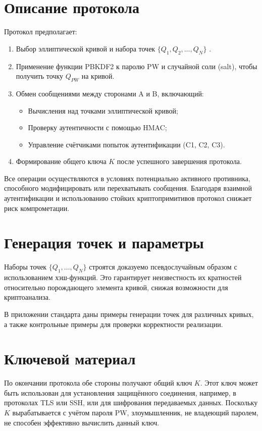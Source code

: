 \section*{Описание протокола}
\label{sec:prot_desc}
Протокол предполагает:
\begin{enumerate}
    \item Выбор эллиптической кривой и набора точек $\{Q_1, Q_2, \ldots, Q_N\}$ .
    \item Применение функции PBKDF2 к паролю PW и случайной соли (salt), чтобы получить точку $Q_{PW}$ на кривой.
    \item Обмен сообщениями между сторонами A и B, включающий:
    \begin{itemize}
        \item Вычисления над точками эллиптической кривой;
        \item Проверку аутентичности с помощью HMAC;
        \item Управление счётчиками попыток аутентификации (C1, C2, C3).
    \end{itemize}
    \item Формирование общего ключа $K$ после успешного завершения протокола.
\end{enumerate}

Все операции осуществляются в условиях потенциально активного противника, способного модифицировать или перехватывать
сообщения.
Благодаря взаимной аутентификации и использованию стойких криптопримитивов протокол снижает риск компрометации.

\section*{Генерация точек и параметры}
\label{sec:points}
Наборы точек $\{Q_1, \ldots, Q_N\}$ строятся доказуемо псевдослучайным образом с использованием хэш-функций.
Это гарантирует неизвестность их кратностей относительно порождающего элемента кривой, снижая возможности для криптоанализа.

В приложении стандарта даны примеры генерации точек для различных кривых, а также контрольные примеры для проверки корректности реализации.

\section*{Ключевой материал}
\label{sec:keymat}
По окончании протокола обе стороны получают общий ключ $K$.
Этот ключ может быть использован для установления защищённого соединения, например, в протоколах TLS или SSH, или для шифрования передаваемых данных.
Поскольку $K$ вырабатывается с учётом пароля PW, злоумышленник, не владеющий паролем, не способен эффективно вычислить данный ключ.

